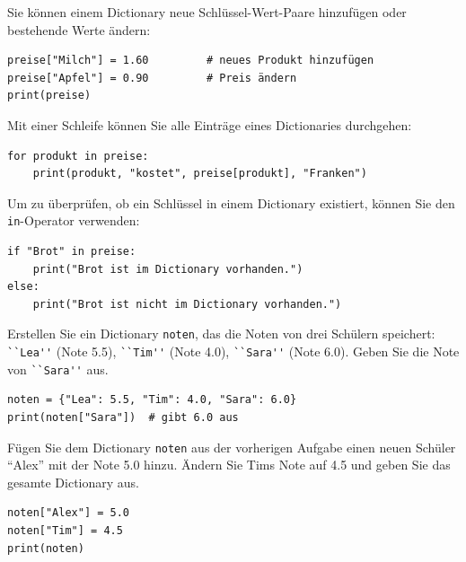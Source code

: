 \begin{myexample}
	Sie können einem Dictionary neue Schlüssel-Wert-Paare hinzufügen oder bestehende Werte ändern:
	\begin{lstlisting}
preise["Milch"] = 1.60         # neues Produkt hinzufügen
preise["Apfel"] = 0.90         # Preis ändern
print(preise)
\end{lstlisting}
\end{myexample}

\begin{myexample}
	Mit einer Schleife können Sie alle Einträge eines Dictionaries durchgehen:
	\begin{lstlisting}
for produkt in preise:
    print(produkt, "kostet", preise[produkt], "Franken")
\end{lstlisting}
\end{myexample}

\begin{myexample}\label{ex:keyExists}
	Um zu überprüfen, ob ein Schlüssel in einem Dictionary existiert, können Sie den \lstinline|in|-Operator verwenden:
	\begin{lstlisting}
if "Brot" in preise:
    print("Brot ist im Dictionary vorhanden.")
else:
    print("Brot ist nicht im Dictionary vorhanden.")
\end{lstlisting}
\end{myexample}

\begin{myexercise}
	Erstellen Sie ein Dictionary \lstinline|noten|, das die Noten von drei Schülern speichert: \lstinline|``Lea''| (Note 5.5), \lstinline|``Tim''| (Note 4.0), \lstinline|``Sara''| (Note 6.0). Geben Sie die Note von \lstinline|``Sara''| aus.

	\begin{myanswer}
		\begin{lstlisting}
noten = {"Lea": 5.5, "Tim": 4.0, "Sara": 6.0}
print(noten["Sara"])  # gibt 6.0 aus
\end{lstlisting}
	\end{myanswer}
\end{myexercise}

\begin{myexercise}
	Fügen Sie dem Dictionary \lstinline|noten| aus der vorherigen Aufgabe einen neuen Schüler \enquote{Alex} mit der Note 5.0 hinzu. Ändern Sie Tims Note auf 4.5 und geben Sie das gesamte Dictionary aus.

	\begin{myanswer}
		\begin{lstlisting}
noten["Alex"] = 5.0
noten["Tim"] = 4.5
print(noten)
\end{lstlisting}
	\end{myanswer}
\end{myexercise}

